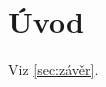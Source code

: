 \documentclass{article}
\begin{document}
\section{Úvod}
\label{sec:úvod}

Viz \ref{sec:závěr}.
\end{document}
